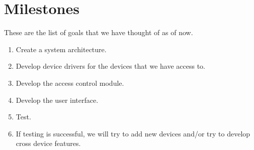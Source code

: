 \documentclass[letterpaper,12pt]{article}
\begin{document}
\section{Milestones}
These are the list of goals that we have thought of as of now.
\begin{enumerate}
 \item Create a system architecture.
 \item Develop device drivers for the devices that we have access to.
 \item Develop the access control module.
 \item Develop the user interface.
 \item Test.
 \item If testing is successful, we will try to add new devices and/or try to develop cross device features.
\end{enumerate}



\end{document}
